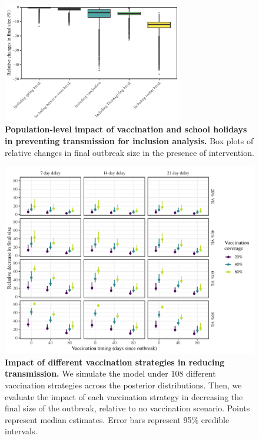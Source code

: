 \documentclass[12pt]{article}
\begin{document}
\pagebreak

\begin{figure}[!th]
\begin{center}
\includegraphics[width=0.7\textwidth]{../figure_stanfit_seirv_final/figure_stanfit_effects_inclusion.pdf}
\caption{
\textbf{Population-level impact of vaccination and school holidays in preventing transmission for inclusion analysis.}
Box plots of relative changes in final outbreak size in the presence of intervention.
}
\end{center}
\end{figure}

\pagebreak

\begin{figure}[!h]
\includegraphics[width=\textwidth]{../figure_stanfit_seirv_final/figure_stanfit_strategy.pdf}
\caption{
\textbf{Impact of different vaccination strategies in reducing transmission.}
We simulate the model under 108 different vaccination strategies across the posterior distributions.
Then, we evaluate the impact of each vaccination strategy in decreasing the final size of the outbreak, relative to no vaccination scenario.
Points represent median estimates.
Error bars represent 95\% credible intervals.
}
\label{fig}
\end{figure}


\pagebreak


\end{document}
